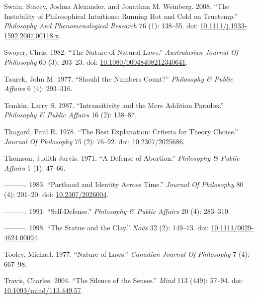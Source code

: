\documentclass[
  10pt,
  letterpaper,
  DIV=11,
  numbers=noendperiod,
  twoside]{scrartcl}
\newlength{\cslhangindent}
\newenvironment{CSLReferences}[2] %
 {\begin{list}{}{%
  \setlength{\itemindent}{0pt}
  \setlength{\leftmargin}{0pt}
  \setlength{\parsep}{0pt}
  \ifodd #1
   \setlength{\leftmargin}{\cslhangindent}
   \setlength{\itemindent}{-1\cslhangindent}
  \fi
  \setlength{\itemsep}{#2\baselineskip}}}
 {\end{list}}
\begin{document}
\begin{CSLReferences}{1}{0}
Swain, Stacey, Joshua Alexander, and Jonathan M. Weinberg. 2008. {``The
Instability of Philosophical Intuitions: Running Hot and Cold on
Truetemp.''} \emph{Philosophy And Phenomenological Research} 76 (1):
138--55. doi:
\href{https://doi.org/10.1111/j.1933-1592.2007.00118.x}{10.1111/j.1933-1592.2007.00118.x}.

Swoyer, Chris. 1982. {``The Nature of Natural Laws.''}
\emph{Australasian Journal Of Philosophy} 60 (3): 203--23. doi:
\href{https://doi.org/10.1080/00048408212340641}{10.1080/00048408212340641}.

Taurek, John M. 1977. {``Should the Numbers Count?''} \emph{Philosophy
\& Public Affairs} 6 (4): 293--316.

Temkin, Larry S. 1987. {``Intransitivity and the Mere Addition
Paradox.''} \emph{Philosophy \& Public Affairs} 16 (2): 138--87.

Thagard, Paul R. 1978. {``The Best Explanation: Criteria for Theory
Choice.''} \emph{Journal Of Philosophy} 75 (2): 76--92. doi:
\href{https://doi.org/10.2307/2025686}{10.2307/2025686}.

Thomson, Judith Jarvis. 1971. {``A Defense of Abortion.''}
\emph{Philosophy \& Public Affairs} 1 (1): 47--66.

---------. 1983. {``Parthood and Identity Across Time.''} \emph{Journal
Of Philosophy} 80 (4): 201--20. doi:
\href{https://doi.org/10.2307/2026004}{10.2307/2026004}.

---------. 1991. {``Self-Defense.''} \emph{Philosophy \& Public Affairs}
20 (4): 283--310.

---------. 1998. {``The Statue and the Clay.''} \emph{Noûs} 32 (2):
149--73. doi:
\href{https://doi.org/10.1111/0029-4624.00094}{10.1111/0029-4624.00094}.

Tooley, Michael. 1977. {``Nature of Laws.''} \emph{Canadian Journal Of
Philosophy} 7 (4): 667--98.

Travis, Charles. 2004. {``The Silence of the Senses.''} \emph{Mind} 113
(449): 57--94. doi:
\href{https://doi.org/10.1093/mind/113.449.57}{10.1093/mind/113.449.57}.


\end{CSLReferences}
\end{document}
